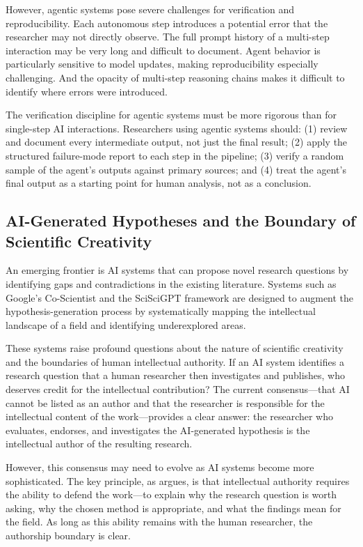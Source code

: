 \documentclass[12pt, a4paper]{article}
\begin{document}
However, agentic systems pose severe challenges for verification and reproducibility. Each autonomous step introduces a potential error that the researcher may not directly observe. The full prompt history of a multi-step interaction may be very long and difficult to document. Agent behavior is particularly sensitive to model updates, making reproducibility especially challenging. And the opacity of multi-step reasoning chains makes it difficult to identify where errors were introduced.

The verification discipline for agentic systems must be more rigorous than for single-step AI interactions. Researchers using agentic systems should: (1) review and document every intermediate output, not just the final result; (2) apply the structured failure-mode report to each step in the pipeline; (3) verify a random sample of the agent's outputs against primary sources; and (4) treat the agent's final output as a starting point for human analysis, not as a conclusion.

\subsection{AI-Generated Hypotheses and the Boundary of Scientific Creativity}

An emerging frontier is AI systems that can propose novel research questions by identifying gaps and contradictions in the existing literature. Systems such as Google's Co-Scientist \citep{gottweis2026coscientist} and the SciSciGPT framework \citep{shao2026sciscigpt} are designed to augment the hypothesis-generation process by systematically mapping the intellectual landscape of a field and identifying underexplored areas.

These systems raise profound questions about the nature of scientific creativity and the boundaries of human intellectual authority. If an AI system identifies a research question that a human researcher then investigates and publishes, who deserves credit for the intellectual contribution? The current consensus---that AI cannot be listed as an author and that the researcher is responsible for the intellectual content of the work---provides a clear answer: the researcher who evaluates, endorses, and investigates the AI-generated hypothesis is the intellectual author of the resulting research.

However, this consensus may need to evolve as AI systems become more sophisticated. The key principle, as \citet{zyphur2026responsible} argues, is that intellectual authority requires the ability to defend the work---to explain why the research question is worth asking, why the chosen method is appropriate, and what the findings mean for the field. As long as this ability remains with the human researcher, the authorship boundary is clear.
\end{document}
